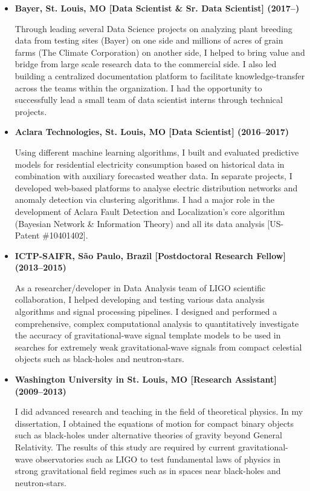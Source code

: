 \documentclass[10pt,a4paper]{moderncv}
\begin{document}
\begin{itemize}
\item \textbf{Bayer, St. Louis, MO [Data Scientist \& Sr. Data Scientist] (2017--)}

Through leading several Data Science projects on analyzing plant breeding data from testing sites (Bayer) on one side and millions of acres of grain farms (The Climate Corporation) on another side, I helped to bring value and bridge from large scale research data to the commercial side. I also led building a centralized documentation platform to facilitate knowledge-transfer across the teams within the organization. I had the opportunity to successfully lead a small team of data scientist interns through technical projects.
\vspace{.2cm}

\item \textbf{Aclara Technologies, St. Louis, MO [Data Scientist] (2016--2017)}

Using different machine learning algorithms, I built and evaluated predictive models for residential electricity consumption based on historical data in combination with auxiliary forecasted weather data. In separate projects, I developed web-based platforms to analyse electric distribution networks and anomaly detection via clustering algorithms. I had a major role in the development of Aclara Fault Detection and Localization's core algorithm (Bayesian Network \& Information Theory) and all its data analysis [US-Patent \#10401402].
\vspace{.2cm}

\item \textbf{ICTP-SAIFR, S\~{a}o Paulo, Brazil [Postdoctoral Research Fellow] (2013--2015)}

As a researcher/developer in Data Analysis team of LIGO scientific collaboration, I helped developing and testing various data analysis algorithms and signal processing pipelines. I designed and performed a comprehensive, complex computational analysis to quantitatively investigate the accuracy of gravitational-wave signal template models to be used in searches for extremely weak gravitational-wave signals from compact celestial objects such as black-holes and neutron-stars.

\vspace{.2cm}
\item \textbf{Washington University in St. Louis, MO [Research Assistant] (2009--2013)}

I did advanced research and teaching in the field of theoretical physics. In my dissertation, I obtained the equations of motion for compact binary objects such as black-holes under alternative theories of gravity beyond General Relativity. The results of this study are required by current gravitational-wave observatories such as LIGO to test fundamental laws of physics in strong gravitational field regimes such as in spaces near black-holes and neutron-stars.
\end{itemize}
\end{document}
